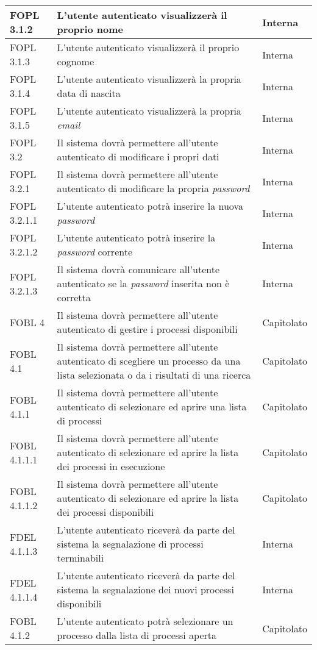 \begin{longtable}{lXp{}}
\midrule
FOPL 3.1.2&L'utente autenticato visualizzerà il proprio nome&Interna\\
\midrule
FOPL 3.1.3&L'utente autenticato visualizzerà il proprio cognome&Interna\\
\midrule
FOPL 3.1.4&L'utente autenticato visualizzerà la propria data di nascita&Interna\\
\midrule
FOPL 3.1.5&L'utente autenticato visualizzerà la propria \textit{email}&Interna\\
\midrule
FOPL 3.2&Il sistema dovrà permettere all'utente autenticato di modificare i propri dati&Interna\\
\midrule
FOPL 3.2.1&Il sistema dovrà permettere all'utente autenticato di modificare la propria \textit{password}&Interna\\
\midrule
FOPL 3.2.1.1&L'utente autenticato potrà inserire la nuova \textit{password}&Interna\\
\midrule
FOPL 3.2.1.2&L'utente autenticato potrà inserire la \textit{password} corrente&Interna\\
\midrule
FOPL 3.2.1.3&Il sistema dovrà comunicare all'utente autenticato se la \textit{password} inserita non è corretta&Interna\\
\midrule
FOBL 4&Il sistema dovrà permettere all'utente autenticato di gestire i processi disponibili&Capitolato\\
\midrule
FOBL 4.1&Il sistema dovrà permettere all'utente autenticato di scegliere un processo da una lista selezionata o da i risultati di una ricerca&Capitolato\\
\midrule
FOBL 4.1.1&Il sistema dovrà permettere all'utente autenticato di selezionare ed aprire una lista di processi&Capitolato\\
\midrule
FOBL 4.1.1.1&Il sistema dovrà permettere all'utente autenticato di selezionare ed aprire la lista dei processi in esecuzione&Capitolato\\
\midrule
FOBL 4.1.1.2&Il sistema dovrà permettere all'utente autenticato di selezionare ed aprire la lista dei processi disponibili&Capitolato\\
\midrule
FDEL 4.1.1.3&L'utente autenticato riceverà da parte del sistema la segnalazione di processi terminabili&Interna\\
\midrule
FDEL 4.1.1.4&L'utente autenticato riceverà da parte del sistema la segnalazione dei nuovi processi disponibili&Interna\\
\midrule
FOBL 4.1.2&L'utente autenticato potrà selezionare un processo dalla lista di processi aperta&Capitolato\\

\end{longtable}
